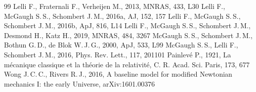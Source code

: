 \documentclass[11pt,a4paper]{article}
\begin{document}
\begin{thebibliography}{99}
 Lelli F., Fraternali F., Verheijen M., 2013, MNRAS, 433, L30
 Lelli F., McGaugh S.\,S., Schombert J.\,M., 2016a, AJ, 152, 157
 Lelli F., McGaugh S.\,S., Schombert J.\,M., 2016b, ApJ, 816, L14
 Lelli F., McGaugh S.\,S., Schombert J.\,M., Desmond H., Katz H., 2019, MNRAS, 484, 3267
 McGaugh S.\,S., Schombert J.\,M., Bothun G.\,D., de Blok W.\,J.\,G., 2000, ApJ, 533, L99
 McGaugh S.\,S., Lelli F., Schombert J.\,M., 2016, Phys. Rev. Lett., 117, 201101
 Painlev\'e P., 1921, La m\'ecanique classique et la th\'eorie de la relativit\'e, C. R. Acad. Sci. Paris, 173, 677
 Wong J.\,C.\,C., Rivers R.\,J., 2016, A baseline model for modified Newtonian mechanics I: the early Universe, arXiv:1601.00376
\end{thebibliography}
\end{document}
